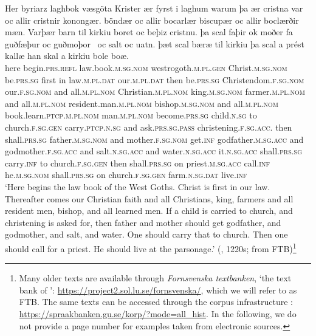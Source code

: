 \documentclass[output=paper]{langscibook}
\begin{document}
\ea    \label{ex:intro:2}
\gll  Her   byriarz                 laghbok                     væsgöta Krister               ær           fyrst   i     laghum           warum           þa ær           cristna                       var                  oc   allir cristnir                   konongær.         böndær               oc   allir bocarlær                       biscupær               oc     allir boclærðir                       mæn.               Varþær       barn           til kirkiu                 boret                 oc   beþiz                   cristnu. þa     scal         faþir           ok   moðer           fa guðfæþur         oc    guðmoþor~      oc   salt         oc   uatn. þæt           scal        bæræ      til   kirkiu         þa   scal a   prést                 kallæ   han                 skal               a     kirkiu bole                       boæ.\\
here   begin.\textsc{prs.refl}     law.book.\textsc{m.sg.nom}     westrogoth.\textsc{m.pl.gen} Christ.\textsc{m.sg.nom}   be.\textsc{prs.sg}     first   in   law\textsc{.m.pl.dat}   our\textsc{.m.pl.dat}   then be.\textsc{prs.sg} Christendom\textsc{.f.sg.nom}   our\textsc{.f.sg.nom}   and   all.\textsc{m.pl.nom} Christian.\textsc{m.pl.nom}   king.\textsc{m.sg.nom}  farmer.\textsc{m.pl.nom}    and  all.\textsc{m.pl.nom} resident.man.\textsc{m.pl.nom}    bishop.\textsc{m.sg.nom}   and    all.\textsc{m.pl.nom} book.learn.\textsc{ptcp}.\textsc{m.pl.nom}   man.\textsc{m.pl.nom}   become.\textsc{prs.sg}     child\textsc{.n.sg}   to  church\textsc{.f.sg.gen}   carry\textsc{.ptcp.n.sg}  and ask.\textsc{prs.sg.pass}   christening\textsc{.f.sg.acc.} then   shall\textsc{.prs.sg}   father\textsc{.m.sg.nom}   and   mother\textsc{.f.sg.nom}   get.\textsc{inf} godfather\textsc{.m.sg.acc} and godmother\textsc{.f.sg.acc}   and salt.\textsc{n.sg.acc}   and   water\textsc{.n.sg.acc} it.\textsc{n.sg.acc}   shall\textsc{.prs.sg}   carry\textsc{.inf}     to   church\textsc{.f.sg.gen}   then   shall\textsc{.prs.sg} on priest\textsc{.m.sg.acc}   call\textsc{.inf}   he\textsc{.m.sg.nom}    shall\textsc{.prs.sg}     on   church\textsc{.f.sg.gen} farm.\textsc{n.sg.dat}         live\textsc{.inf}\\
\glt ‘Here begins the law book of the West Goths. Christ is first in our law. Thereafter comes our Christian faith and all Christians, king, farmers and all resident men, bishop, and all learned men. If a child is carried to church, and christening is asked for, then father and mother should get godfather, and godmother, and salt, and water. One should carry that to church. Then one should call for a priest. He should live at the parsonage.’ (, 1220s; from FTB)\footnote{Many older  texts are available through \textit{Fornsvenska textbanken}, ‘the text bank of ’: \url{https://project2.sol.lu.se/fornsvenska/}, which we will refer to as FTB. The same texts can be accessed through the corpus infrastructure  \citep{BorinEtAl2012}: \url{https://spraakbanken.gu.se/korp/?mode=all_hist}. In the following, we do not provide a page number for examples taken from electronic sources.}
\z
\end{document}
